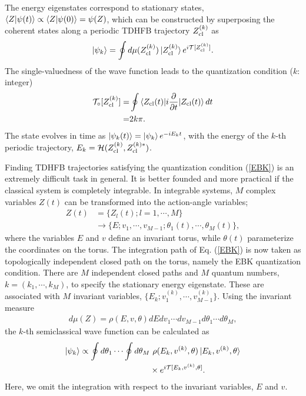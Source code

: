 \documentclass[11pt]{book} %
\begin{document}
The energy eigenstates correspond to stationary states,
$\braket{Z|\psi(t)} \propto \braket{Z|\psi(0)}=\psi(Z)$,
which can be constructed by superposing the coherent states along
a periodic TDHFB trajectory $Z_{\rm cl}^{(k)}$ as \cite{KS80,K81,SM88}
\begin{equation}
	\ket{\psi_k} = \oint d\mu(Z_{\rm cl}^{(k)}) \ket{Z_{\rm cl}^{(k)}}
	e^{i\mathcal{T}[Z_{\rm cl}^{(k)}]} .
\end{equation}
The single-valuedness of the wave function leads to
the quantization condition ($k$: integer)
\begin{align}
	\mathcal{T}_\circ[Z_{\rm cl}^{(k)}]=&
	\oint \braket{Z_{\rm cl}(t)| i\frac{\partial}{\partial t}
	|Z_{\rm cl}(t)} dt  \nonumber \\
	=& 2k\pi .
	\label{EBK}
\end{align}
The state evolves in time as $\ket{\psi_k(t)}=\ket{\psi_k}e^{-iE_k t}$,
with the energy of the $k$-th periodic trajectory,
$E_k=\mathcal{H}(Z_{\rm cl}^{(k)},Z_{\rm cl}^{(k)*})$.

Finding TDHFB trajectories satisfying the quantization condition
(\ref{EBK}) is an extremely difficult task in general.
It is better founded and more practical
if the classical system is completely integrable.
In integrable systems, $M$ complex variables $Z(t)$ can be transformed into
the action-angle variables;
\begin{align}
	Z(t) &= \{Z_l(t);l=1,\cdots,M \} \nonumber \\
	&\rightarrow
	\{E; v_1,\cdots,v_{M-1}; \theta_1(t),\cdots,\theta_M(t)\} ,
\end{align}
where the variables $E$ and $v$ define an invariant torus,
while $\theta(t)$ parameterize the coordinates on the torus.
The integration path of Eq. (\ref{EBK}) is now taken as topologically
independent closed path on the torus,
namely the EBK quantization condition.
There are $M$ independent closed paths and $M$ quantum numbers,
$k=(k_1,\cdots,k_M)$, to specify the stationary energy eigenstate.
These are associated with $M$ invariant variables,
$\{E_k;v_1^{(k)},\cdots,v_{M-1}^{(k)}\}$.
Using the invariant measure
\begin{align}
  d\mu(Z) = \rho(E,v,\theta) dEdv_1\cdots dv_{M-1}d\theta_1\cdots d\theta_M,
\end{align}
the $k$-th semiclassical wave function can be calculated as
\begin{align}
  \ket{\psi_k} \propto \oint d\theta_1\cdots \oint d\theta_M &\ 
	\rho(E_k,v^{(k)},\theta)
	\ket{E_k,v^{(k)},\theta} \nonumber \\
	&\times e^{i\mathcal{T}[E_k,v^{(k)},\theta]} .
  \label{semi_wave_func}
\end{align}
Here, we omit the integration with respect to the invariant variables,
$E$ and $v$.
\end{document}
